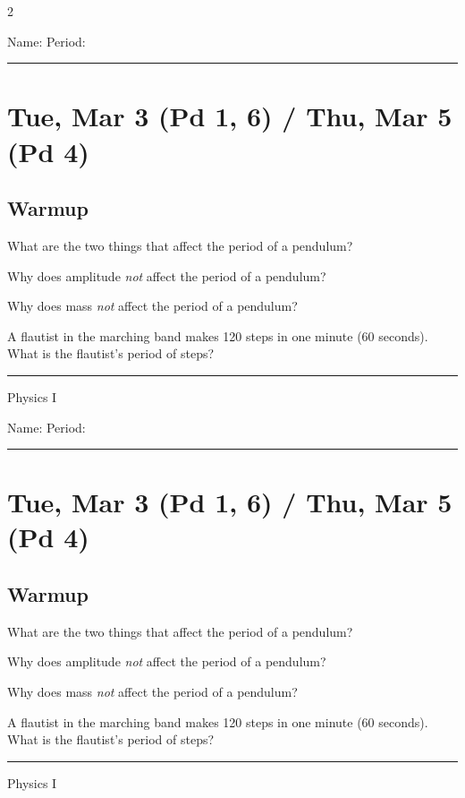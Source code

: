 \documentclass[10pt,landscape]{exam}
\def\todayDate{Tue, Mar 3 (Pd 1, 6) / Thu, Mar 5 (Pd 4)}
\def\content{
\begin{questions}
\question
  What are the two things that affect the period of a pendulum?
  \vs

\question
  Why does amplitude \emph{not} affect the period of a pendulum?
  \vs[2]

\question
  Why does mass \emph{not} affect the period of a pendulum?
  \vs[2]

\question
  A flautist in the marching band makes 120 steps in one minute (60 seconds).  What is the flautist's period of steps? \vs
\end{questions}
}
\begin{document}
\pagestyle{empty}

\setlength{\columnsep}{0.8in}
\begin{multicols*}{2}

\noindent  
Name: \hfill Period: \hspace{5em}
\vspace{0.5em}
\hrule

\section*{\todayDate}
\subsection*{Warmup}

\content

\vfill
\hrule
\vspace{0.5em}
\hfill {\sc Physics I}

\columnbreak

\noindent  
Name: \hfill Period: \hspace{5em}
\vspace{0.5em}
\hrule

\section*{\todayDate}
\subsection*{Warmup}

\content

\vfill
\hrule
\vspace{0.5em}
\hfill {\sc Physics I}

\end{multicols*}
\end{document}
